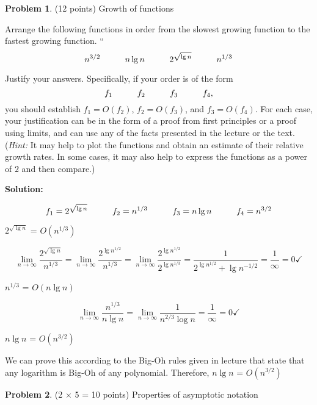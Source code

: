 \documentclass[11pt]{article}
\newcommand{\hs}{\hspace{0.2in}}
\theoremstyle{definition}
\theoremstyle{theorem}
\newtheorem{prob}{Problem}
\begin{document}
\newpage
\begin{prob}
\label{prob:function_growth}
(12 points) Growth of functions
\end{prob}

Arrange the following functions in order from the slowest growing
function to the fastest growing function.  
``
\[ n^{3/2} \hs \hs n\lg n \hs \hs 2^{\sqrt{\lg n}} \hs \hs n^{1/3}\]

Justify your answers.  Specifically, if your order is of the form
\[
f_1 \hs \hs f_2 \hs \hs f_3 \hs \hs f_4,
\]
you should establish $f_1 = O(f_2)$, $f_2 = O(f_3)$, and $f_3 =
O(f_4)$.  For each case, your justification can be in the form of a
proof from first principles or a proof using limits, and can use any
of the facts presented in the lecture or the text.  ({\em Hint:} It
may help to plot the functions and obtain an estimate of their
relative growth rates.  In some cases, it may also help to express the
functions as a power of $2$ and then compare.)
\begin{flushleft}
\textbf{Solution:}
\end{flushleft}
\[
f_1 = 2^{\sqrt{\lg n}} \hs \hs f_2 = n^{1/3} \hs \hs f_3 = n\lg n \hs \hs f_4= n^{3/2}
\]
\begin{flushleft}
$2^{\sqrt{\lg n}}$ = $O(n^{1/3})$ \hs 
\end{flushleft}
\[ 
\lim_{n\to\infty} \frac{2^{\sqrt{\lg n}}}{n^{1/3}} = \lim_{n\to\infty} \frac{2^{\lg n^{1/2}}}{n^{1/3}} = \lim_{n\to\infty} \frac{2^{\lg n^{1/2}}}{2^{\lg n^{1/3}}} = \frac{1}{2^{\lg n^{1/2}}+\lg n^{-1/2}} = \frac{1}{\infty} = 0 \checkmark
\]
\begin{flushleft}
$n^{1/3}$ = $O(n\lg n)$ \hs
\end{flushleft}
\[ 
\lim_{n\to\infty} \frac{n^{1/3}}{n\lg n} = \lim_{n\to\infty} \frac{1}{n^{2/3}\log n} = \frac{1}{\infty} = 0 \checkmark
\]
\begin{flushleft}
$n\lg n$ = $O(n^{3/2})$ \hs
\end{flushleft}
\begin{center}
We can prove this according to the Big-Oh rules given in lecture that state that any logarithm is Big-Oh of any polynomial. Therefore, $n\lg n$ = $O(n^{3/2})$ \checkmark
\end{center}
\newpage

\begin{prob}
\label{prob:asymptotics}
(2 $\times$ 5 = 10 points) Properties of asymptotic notation
\end{prob}
\end{document}
